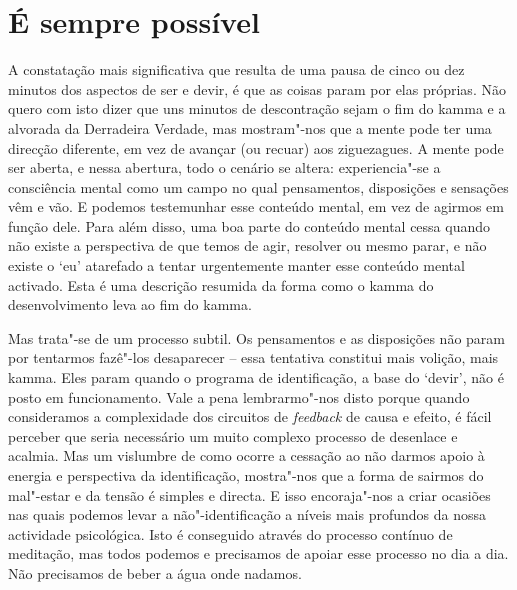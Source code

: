 \section{É sempre possível}

A constatação mais significativa que resulta de uma pausa de cinco ou dez
minutos dos aspectos de ser e devir, é que as coisas param por elas próprias.
Não quero com isto dizer que uns minutos de descontração sejam o fim do kamma e
a alvorada da Derradeira Verdade, mas mostram"-nos que a mente pode ter uma
direcção diferente, em vez de avançar (ou recuar) aos ziguezagues. A mente pode
ser aberta, e nessa abertura, todo o cenário se altera: experiencia"-se a
consciência mental como um campo no qual pensamentos, disposições e sensações
vêm e vão. E podemos testemunhar esse conteúdo mental, em vez de agirmos em
função dele. Para além disso, uma boa parte do conteúdo mental cessa quando não
existe a perspectiva de que temos de agir, resolver ou mesmo parar, e não existe
o `eu' atarefado a tentar urgentemente manter esse conteúdo mental
activado.
Esta é uma descrição resumida da forma como o kamma do desenvolvimento leva ao
fim do kamma.

Mas trata"-se de um processo subtil. Os pensamentos e as disposições não param
por tentarmos fazê"-los desaparecer -- essa tentativa constitui mais volição,
mais kamma. Eles param quando o programa de identificação, a base do `devir',
não é posto em funcionamento. Vale a pena lembrarmo"-nos disto porque quando
consideramos a complexidade dos circuitos de \emph{feedback} de causa e efeito,
é fácil perceber que seria necessário um muito complexo processo de desenlace e
acalmia. Mas um vislumbre de como ocorre a cessação ao não darmos apoio à
energia e perspectiva da identificação, mostra"-nos que a forma de sairmos do
mal"-estar e da tensão é simples e directa. E isso encoraja"-nos a criar ocasiões
nas quais podemos levar a não"-identificação a níveis mais profundos da nossa
actividade psicológica. Isto é conseguido através do processo contínuo de
meditação, mas todos podemos e precisamos de apoiar esse processo no dia a dia.
Não precisamos de beber a água onde nadamos.

